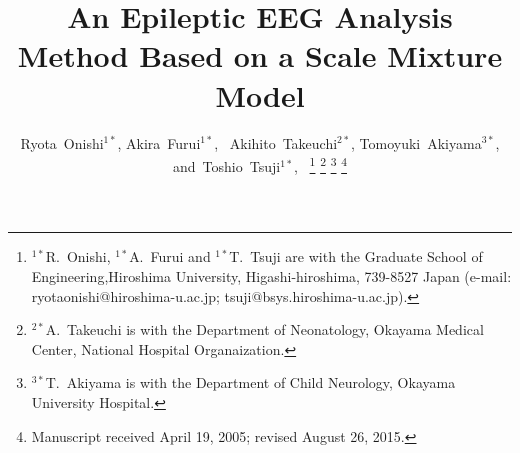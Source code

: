 \documentclass[journal]{IEEEtran}
\begin{document}
%
\title{An Epileptic EEG Analysis Method Based on a Scale Mixture Model}
%
%
%

\author{Ryota~Onishi${}^{1*}$,
        Akira~Furui${}^{1*}$,~
        Akihito~Takeuchi${}^{2*}$,
        Tomoyuki~Akiyama${}^{3*}$,
        and~Toshio~Tsuji${}^{1*}$,~%
\thanks{${}^{1*}$R.~Onishi, ${}^{1*}$A.~Furui and ${}^{1*}$T.~Tsuji are with the Graduate School of Engineering,Hiroshima University, Higashi-hiroshima, 739-8527 Japan (e-mail: ryotaonishi@hiroshima-u.ac.jp; tsuji@bsys.hiroshima-u.ac.jp).}%
\thanks{${}^{2*}$A.~Takeuchi is with the Department of Neonatology, Okayama Medical Center, National Hospital Organaization.}
\thanks{${}^{3*}$T.~Akiyama is with the Department of Child Neurology, Okayama University Hospital.}%
\thanks{Manuscript received April 19, 2005; revised August 26, 2015.}}

%
%
\end{document}
